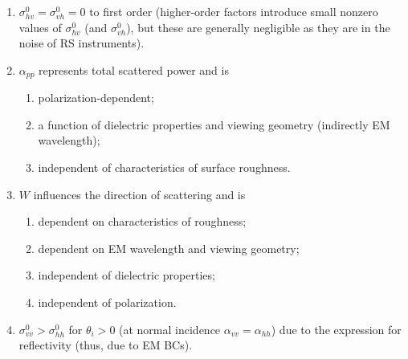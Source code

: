 \documentclass[11pt, oneside]{article}
\begin{document}
\begin{enumerate}
	\item $\sigma_{hv}^0 = \sigma_{vh}^0 = 0$ to first order (higher-order factors introduce small nonzero values of $\sigma_{hv}^0$ (and $\sigma_{vh}^0$), but these are generally negligible as they are in the noise of RS instruments).
	\item $\alpha_{pp}$ represents total scattered power and is
	\begin{enumerate}
		\item polarization-dependent;
		\item a function of dielectric properties and viewing geometry (indirectly EM wavelength);
		\item independent of characteristics of surface roughness.
	\end{enumerate}
	\item $W$ influences the direction of scattering and is
	\begin{enumerate}
		\item dependent on characteristics of roughness;
		\item dependent on EM wavelength and viewing geometry;
		\item independent of dielectric properties;
		\item independent of polarization.
	\end{enumerate}
	\item $\sigma_{vv}^0 > \sigma_{hh}^0$ for $\theta_i > 0$ (at normal incidence $\alpha_{vv} = \alpha_{hh}$) due to the expression for reflectivity (thus, due to EM BCs).
\end{enumerate}
\end{document}
